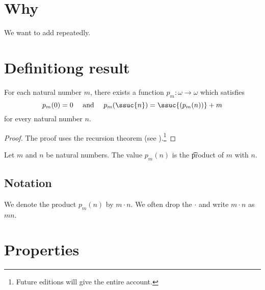 

\section*{Why}

We want to add repeatedly.

\section*{Definitiong result}

\begin{proposition}
For each natural number $m$, there exists a function $p_m: \omega  \to \omega $ which satisfies
\[
p_m(0) = 0 \quad \text{ and } \quad p_m(\ssuc{n}) = \ssuc{(p_m(n))} + m
\]
for every natural number $n$.
\end{proposition}

\begin{proof}The proof uses the recursion theorem (see ).\footnote{Future editions will give the entire account.}\end{proof}
Let $m$ and $n$ be natural numbers.
The value $p_m(n)$ is the \t{product} of $m$ with $n$.

% 

\subsection*{Notation}

We denote the product $p_m(n)$ by $m \cdot  n$.
We often drop the $\cdot $ and write $m \cdot  n$ as $mn$.


\section*{Properties}

